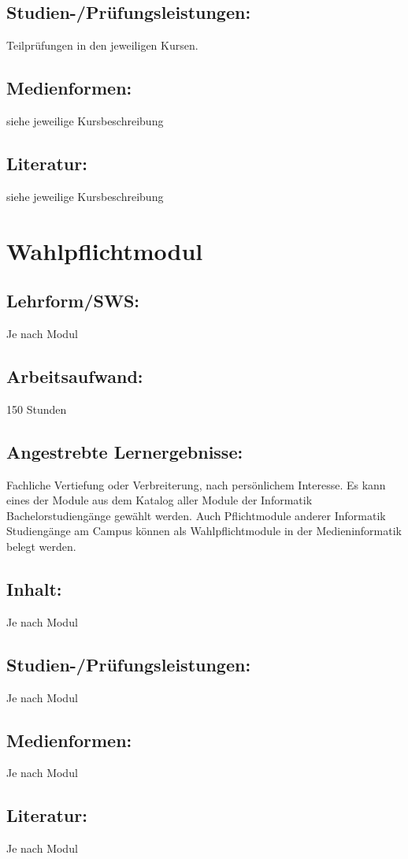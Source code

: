 \section*{Studien-/Prüfungsleistungen:}\label{studien-pruxfcfungsleistungen-26}

Teilprüfungen in den jeweiligen Kursen.

\section*{Medienformen:}\label{medienformen-20}

siehe jeweilige Kursbeschreibung

\section*{Literatur:}\label{literatur-27}

siehe jeweilige Kursbeschreibung

\chapter{Wahlpflichtmodul}\label{wahlpflichtmodul}

\section*{Lehrform/SWS:}\label{lehrformsws-28}

Je nach Modul

\section*{Arbeitsaufwand:}\label{arbeitsaufwand-24}

150 Stunden

\section*{Angestrebte
Lernergebnisse:}\label{angestrebte-lernergebnisse-32}

Fachliche Vertiefung oder Verbreiterung, nach persönlichem Interesse. Es
kann eines der Module aus dem Katalog aller Module der Informatik
Bachelorstudiengänge gewählt werden. Auch Pflichtmodule anderer
Informatik Studiengänge am Campus können als Wahlpflichtmodule in der
Medieninformatik belegt werden.

\section*{Inhalt:}\label{inhalt-32}

Je nach Modul

\section*{Studien-/Prüfungsleistungen:}\label{studien-pruxfcfungsleistungen-27}

Je nach Modul

\section*{Medienformen:}\label{medienformen-21}

Je nach Modul

\section*{Literatur:}\label{literatur-28}

Je nach Modul
